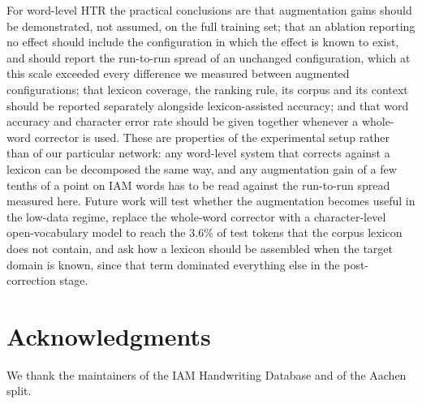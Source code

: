 \documentclass{ws-ijprai}
\begin{document}
For word-level HTR the practical conclusions are that augmentation
gains should be demonstrated, not assumed, on the full training set;
that an ablation reporting no effect should include the configuration
in which the effect is known to exist, and should report the
run-to-run spread of an unchanged configuration, which at this scale
exceeded every difference we measured between augmented configurations; that lexicon
coverage, the ranking rule, its corpus and its context should be
reported separately alongside lexicon-assisted accuracy; and that word
accuracy and character error rate should be given together whenever a
whole-word corrector is used. These are properties of the experimental
setup rather than of our particular network: any word-level system that
corrects against a lexicon can be decomposed the same way, and any
augmentation gain of a few tenths of a point on IAM words has to be read
against the run-to-run spread measured here. Future work will test whether the
augmentation becomes useful in the low-data regime, replace the
whole-word corrector with a character-level open-vocabulary model to reach
the 3.6\% of test tokens that the corpus lexicon does not contain, and ask
how a lexicon should be assembled when the target domain is known, since
that term dominated everything else in the post-correction stage.


\section*{Acknowledgments}
We thank the maintainers of the IAM Handwriting Database and of the
Aachen split.



\end{document}
